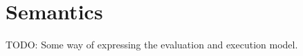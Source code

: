 \documentclass[../main.tex]{subfiles}
\begin{document}
\section{Semantics}\label{section:semantics}

TODO: Some way of expressing the evaluation and execution model.
\end{document}
